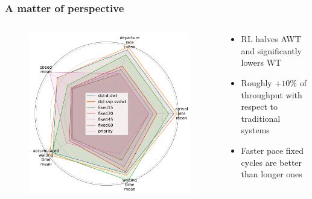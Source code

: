 \documentclass[dvipsnames]{beamer}
\begin{document}
\begin{frame}
\frametitle{A matter of perspective}
  \begin{columns}
  \begin{column}{0.5\textwidth}
    \begin{figure}
      \centering
      \includegraphics[width=1.0\textwidth]{figures/total-radar.png}
    \end{figure}
  \end{column}
  \begin{column}{0.5\textwidth}
    \begin{itemize}
      \item RL halves AWT and significantly lowers WT
      \item Roughly $+10\%$ of throughput with respect to traditional systems
      \item Faster pace fixed cycles are better than longer ones
    \end{itemize}
  \end{column}
\end{columns}
\end{frame}
\end{document}
